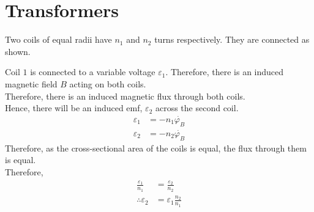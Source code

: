 \documentclass[fleqn, a4paper, 12pt, twoside]{article}
\theoremstyle{definition}
\theoremstyle{theorem}
\begin{document}
\section{Transformers}

Two coils of equal radii have $n_1$ and $n_2$ turns respectively.
They are connected as shown.
\begin{figure}[H]
\end{figure}
Coil $1$ is connected to a variable voltage $\varepsilon_1$.
Therefore, there is an induced magnetic field $B$ acting on both coils.\\
Therefore, there is an induced magnetic flux through both coils.\\
Hence, there will be an induced emf, $\varepsilon_2$ across the second coil.
\begin{align*}
	\varepsilon_1 & = -n_1 \dot{\varphi_B} \\
	\varepsilon_2 & = -n_2 \dot{\varphi_B}
\end{align*}
Therefore, as the cross-sectional area of the coils is equal, the flux through them is equal.\\
Therefore,
\begin{align*}
	\frac{\varepsilon_1}{n_1} & = \frac{\varepsilon_2}{n_2} \\
	\therefore \varepsilon_2  & = \varepsilon_1 \frac{n_2}{n_1}
\end{align*}
\end{document}
